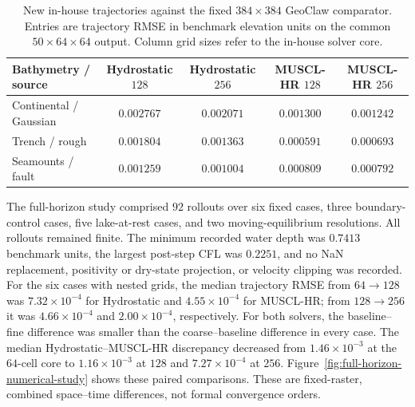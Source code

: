 \begin{table}[pos=!htbp]
\centering
\caption{New in-house trajectories against the fixed $384 \times 384$ GeoClaw comparator. Entries are trajectory RMSE in benchmark elevation units on the common $50\times64\times64$ output. Column grid sizes refer to the in-house solver core.}
\label{tab:matched-geoclaw-refinement}
\small
\begin{tabular}{lcccc}
\toprule
Bathymetry / source & \shortstack{Hydrostatic\\$128$} & \shortstack{Hydrostatic\\$256$} & \shortstack{MUSCL-HR\\$128$} & \shortstack{MUSCL-HR\\$256$} \\
\midrule
Continental / Gaussian & $0.002767$ & $0.002071$ & $0.001300$ & $0.001242$ \\
Trench / rough & $0.001804$ & $0.001363$ & $0.000591$ & $0.000693$ \\
Seamounts / fault & $0.001259$ & $0.001004$ & $0.000809$ & $0.000792$ \\
\bottomrule
\end{tabular}
\end{table}

The full-horizon study comprised $92$ rollouts over six fixed cases, three boundary-control cases, five lake-at-rest cases, and two moving-equilibrium resolutions. All rollouts remained finite. The minimum recorded water depth was $0.7413$ benchmark units, the largest post-step CFL was $0.2251$, and no NaN replacement, positivity or dry-state projection, or velocity clipping was recorded. For the six cases with nested grids, the median trajectory RMSE from $64 \rightarrow 128$ was $7.32 \times 10 ^ {-4}$ for Hydrostatic and $4.55 \times 10 ^ {-4}$ for MUSCL-HR; from $128 \rightarrow 256$ it was $4.66 \times 10 ^ {-4}$ and $2.00 \times 10 ^ {-4}$, respectively. For both solvers, the baseline--fine difference was smaller than the coarse--baseline difference in every case. The median Hydrostatic--MUSCL-HR discrepancy decreased from $1.46 \times 10 ^ {-3}$ at the $64$-cell core to $1.16 \times 10 ^ {-3}$ at $128$ and $7.27 \times 10 ^ {-4}$ at $256$. Figure~\ref{fig:full-horizon-numerical-study} shows these paired comparisons. These are fixed-raster, combined space--time differences, not formal convergence orders.

